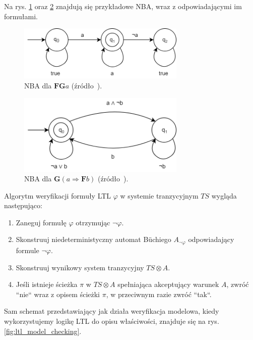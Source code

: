 Na rys. \ref{fig:nba1} oraz \ref{fig:nba2} znajdują się przykładowe NBA, wraz z odpowiadającymi im formułami.

\begin{figure}[h]
    \centering
    \includegraphics[width=8cm,keepaspectratio]{img/nba1.png}
    \caption{NBA dla $\mathbf{FG}a$ (źródło~\cite{Bai08}).}
    \label{fig:nba1}
\end{figure}
\begin{figure}[h]
    \centering
    \includegraphics[width=8cm,keepaspectratio]{img/nba2.png}
    \caption{NBA dla $\mathbf{G}(a \Rightarrow \mathbf{F}b)$ (źródło~\cite{Bai08}).}
    \label{fig:nba2}
\end{figure}

\noindent
Algorytm weryfikacji formuły LTL $\varphi$ w systemie tranzycyjnym $TS$ wygląda następująco:
\begin{enumerate}
    \item Zaneguj formułę $\varphi$ otrzymując $\neg\varphi$.
    \item Skonstruuj niedeterministyczny automat Büchiego $A_{\neg\varphi}$ odpowiadający formule $\neg\varphi$.
    \item Skonstruuj wynikowy system tranzycyjny $TS \otimes A$.
    \item Jeśli istnieje ścieżka $\pi$ w $TS \otimes A$ spełniająca akceptujący warunek $A$, zwróć ``nie`` wraz z opisem ścieżki $\pi$, w przeciwnym razie zwróć ``tak``.
\end{enumerate}

Sam schemat przedstawiający jak działa weryfikacja modelowa, kiedy wykorzystujemy logikę LTL do opisu właściwości, znajduje się na rys. \ref{fig:ltl_model_checking}.

